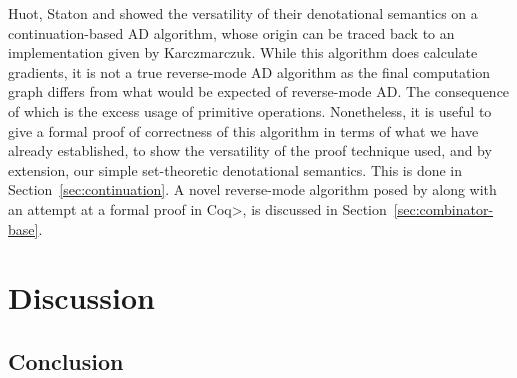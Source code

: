 \documentclass[11pt, final]{article}
\begin{document}
  Huot, Staton and \Vakar{} showed the versatility of their denotational semantics on a continuation-based AD algorithm, whose origin can be traced back to an implementation given by Karczmarczuk\cite{Karczmarczuk98functionaldifferentiation}.
  While this algorithm does calculate gradients, it is not a true reverse-mode AD algorithm as the final computation graph differs from what would be expected of reverse-mode AD\cite{PearlmutterSiskind2008}.
  The consequence of which is the excess usage of primitive operations.
  Nonetheless, it is useful to give a formal proof of correctness of this algorithm in terms of what we have already established, to show the versatility of the proof technique used, and by extension, our simple set-theoretic denotational semantics.
  This is done in Section~\ref{sec:continuation}.
  A novel reverse-mode algorithm posed by \Vakar{}\cite{} along with an attempt at a formal proof in \<Coq>, is discussed in Section~\ref{sec:combinator-base}.
  
  
\section{Discussion}
  
  \subsection{Conclusion}
\appendix
\printbibliography
\makeatother
\end{document}
